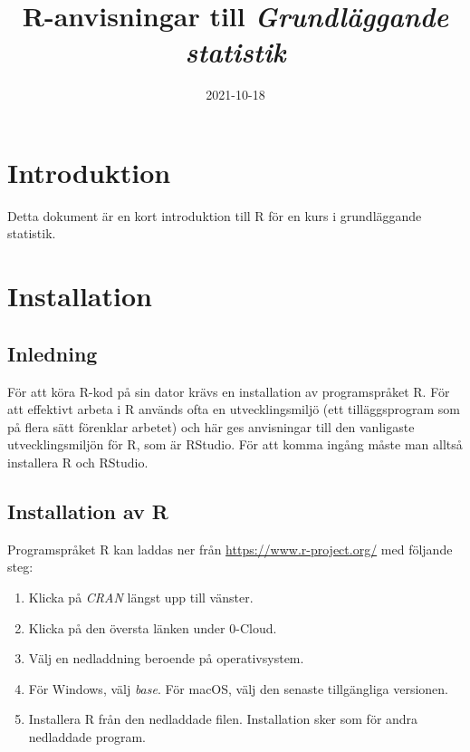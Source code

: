 \documentclass[
]{book}
\title{R-anvisningar till \emph{Grundläggande statistik}}
\author{}
\date{\vspace{-2.5em}2021-10-18}
\providecommand{\tightlist}{%
  \setlength{\itemsep}{0pt}\setlength{\parskip}{0pt}}
\theoremstyle{definition}
\theoremstyle{definition}
\theoremstyle{definition}
\theoremstyle{definition}
\theoremstyle{remark}
\begin{document}
\maketitle

{
\setcounter{tocdepth}{1}
\tableofcontents
}
\hypertarget{introduktion}{%
\chapter{Introduktion}\label{introduktion}}

Detta dokument är en kort introduktion till R för en kurs i grundläggande statistik.

\hypertarget{installation}{%
\chapter{Installation}\label{installation}}

\hypertarget{inledning}{%
\section{Inledning}\label{inledning}}

För att köra R-kod på sin dator krävs en installation av programspråket R. För att effektivt arbeta i R används ofta en utvecklingsmiljö (ett tilläggsprogram som på flera sätt förenklar arbetet) och här ges anvisningar till den vanligaste utvecklingsmiljön för R, som är RStudio. För att komma ingång måste man alltså installera R och RStudio.

\hypertarget{installation-av-r}{%
\section{Installation av R}\label{installation-av-r}}

Programspråket R kan laddas ner från \url{https://www.r-project.org/} med följande steg:

\begin{enumerate}
\def\labelenumi{\arabic{enumi}.}
\tightlist
\item
  Klicka på \emph{CRAN} längst upp till vänster.
\item
  Klicka på den översta länken under 0-Cloud.
\item
  Välj en nedladdning beroende på operativsystem.
\item
  För Windows, välj \emph{base}. För macOS, välj den senaste tillgängliga versionen.
\item
  Installera R från den nedladdade filen. Installation sker som för andra nedladdade program.
\end{enumerate}
\end{document}
